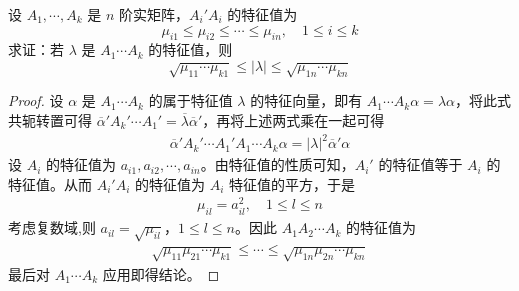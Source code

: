 \documentclass[../../main.tex]{subfiles}%
\begin{document}
\begin{example}\label{example:例9.56}
设 \(A_1,\cdots,A_k\) 是 \(n\) 阶实矩阵，\(A_i'A_i\) 的特征值为
\[
\mu_{i1} \leqslant  \mu_{i2} \leqslant  \cdots \leqslant  \mu_{in},\quad 1\leqslant  i \leqslant  k
\]
求证：若 \(\lambda\) 是 \(A_1\cdots A_k\) 的特征值，则
\[
\sqrt{\mu_{11}\cdots\mu_{k1}} \leqslant  |\lambda| \leqslant  \sqrt{\mu_{1n}\cdots\mu_{kn}}
\]
\end{example}
\begin{proof}
设 \(\alpha\) 是 \(A_1\cdots A_k\) 的属于特征值 \(\lambda\) 的特征向量，即有 \(A_1\cdots A_k\alpha = \lambda\alpha\)，将此式共轭转置可得 \(\overline{\alpha}'A_k'\cdots A_1' = \overline{\lambda}\overline{\alpha}'\)，再将上述两式乘在一起可得
\begin{align*}
\overline{\alpha}'A_k'\cdots A_1'A_1\cdots A_k\alpha = |\lambda|^2\overline{\alpha}'\alpha
\end{align*}
设 \(A_i\) 的特征值为 \(a_{i1},a_{i2},\cdots,a_{in}\)。由特征值的性质可知，\(A_i'\) 的特征值等于 \(A_i\) 的特征值。从而 \(A_i'A_i\) 的特征值为 \(A_i\) 特征值的平方，于是
\begin{align*}
\mu_{il} = a_{il}^2,\quad 1\leqslant  l \leqslant  n
\end{align*}
考虑复数域,则 \(a_{il} = \sqrt{\mu_{il}}\)，\(1\leqslant  l \leqslant  n\)。因此 \(A_1A_2\cdots A_k\) 的特征值为
\begin{align*}
\sqrt{\mu_{11}\mu_{21}\cdots\mu_{k1}} \leqslant  \cdots \leqslant  \sqrt{\mu_{1n}\mu_{2n}\cdots\mu_{kn}}
\end{align*}
最后对 \(A_1\cdots A_k\) 应用即得结论。 
\end{proof}
\end{document}
